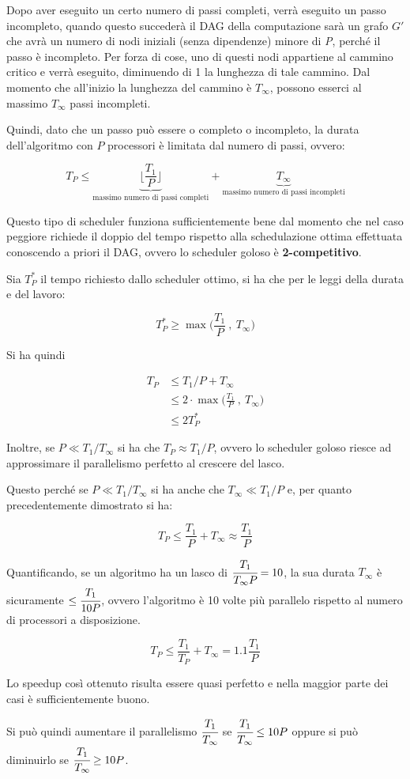 Dopo aver eseguito un certo numero di passi completi, verrà eseguito un passo incompleto, quando questo succederà il DAG della computazione sarà un grafo $G'$ che avrà un numero di nodi iniziali (senza dipendenze) minore di \emph{P}, perché il passo è incompleto. 
Per forza di cose, uno di questi nodi appartiene al cammino critico e verrà eseguito, diminuendo di 1 la lunghezza di tale cammino. 
Dal momento che all'inizio la lunghezza del cammino è $T_\infty$, possono esserci al massimo
$T_\infty$ passi incompleti.

Quindi, dato che un passo può essere o completo o incompleto, la durata dell'algoritmo con $ P $ processori è limitata dal numero di passi, ovvero:

$$
T_P \leq \underbrace{\bigg\lfloor \frac{T_1}{P}\bigg\rfloor}_{\text{massimo numero di passi completi}} + \underbrace{T_\infty}_{\text{massimo numero di passi incompleti}}
$$

Questo tipo di scheduler funziona sufficientemente bene dal momento che nel caso peggiore richiede il doppio del tempo rispetto alla schedulazione ottima effettuata conoscendo a priori il DAG, ovvero lo scheduler goloso è \textbf{2-competitivo}.

Sia $T_{P}^*$ il tempo richiesto dallo scheduler ottimo, si ha che per le leggi della durata e del lavoro:

$$T_{P}^* \geq \max \bigg( \frac{T_1}{P} \: , \: T_\infty \bigg)$$

Si ha quindi 

\begin{align*}
T_{P} &\leq T_1/P + T_\infty \\
		 &\leq 2 \cdot \max \bigg( \frac{T_1}{P} \: , \: T_\infty \bigg) \\
		 &\leq 2T_{P}^*
\end{align*}

Inoltre, se $ P \ll T_1 / T_\infty $ si ha che $ T_P \approx T_1/P$, ovvero lo scheduler goloso riesce ad approssimare il parallelismo perfetto al crescere del lasco.

Questo perché se $ P \ll T_1 / T_\infty $ si ha anche che $T_\infty \ll T_1 / P$ e, per quanto precedentemente dimostrato si ha:

$$
T_P \leq \frac{T_1}{P} + T_\infty \approx \frac{T_1}{P}
$$

Quantificando, se un algoritmo ha un lasco di $\cfrac{T_1}{T_\infty P} = 10$, la sua durata $ T_\infty $ è sicuramente $\leq \cfrac{T_1}{10 P}$, ovvero l'algoritmo è 10 volte più parallelo rispetto al numero di processori a disposizione.

$$
T_P \leq \frac{T_1}{T_P} + T_\infty = 1.1 \frac{T_1}{P}
$$

Lo speedup così ottenuto risulta essere quasi perfetto e nella maggior parte dei casi è sufficientemente buono.

Si può quindi aumentare il parallelismo $\cfrac{T_1}{T_\infty}$ se $\cfrac{T_1}{T_\infty} \leq 10 P$  oppure si può diminuirlo se $\cfrac{T_1}{T_\infty} \geq 10 P$.
